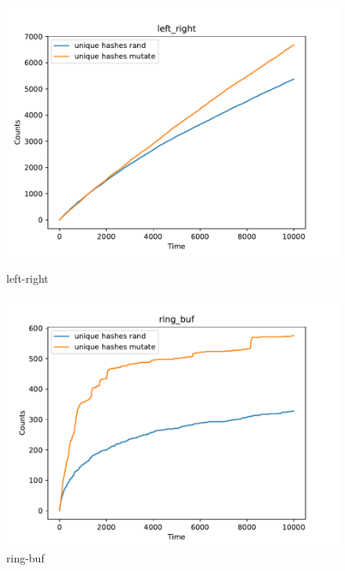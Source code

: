 \begin{figure}[H]
        \vspace{0.5cm}
        
        \begin{minipage}{0.45\textwidth}
            \centering
            \includegraphics[width=\textwidth]{figure/left_right.pdf}
            \caption{left-right}
            \label{cover-plot1-left-right}
        \end{minipage}  
        \hfill
        \begin{minipage}{0.45\textwidth}
            \centering
            \includegraphics[width=\textwidth]{figure/ring_buf.pdf}
            \caption{ring-buf}
            \label{cover-plot1-ring-buf}
        \end{minipage}   
    
\end{figure}